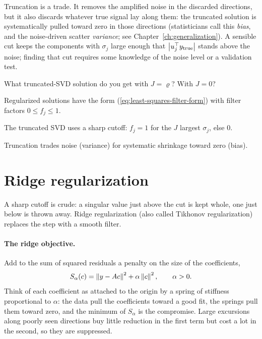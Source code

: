 Truncation is a trade. It removes the amplified noise in the discarded directions, but it also discards whatever true signal lay along them: the truncated solution is systematically pulled toward zero in those directions (statisticians call this \emph{bias}, and the noise-driven scatter \emph{variance}; see Chapter~\ref{ch:generalization}). A sensible cut keeps the components with $\sigma_j$ large enough that $\left\lvert u_j^\top y_{\rm true}\right\rvert$ stands above the noise; finding that cut requires some knowledge of the noise level or a validation test.

\begin{checkpoint}
What truncated-SVD solution do you get with $J = \varrho$? With $J = 0$?
\end{checkpoint}

\begin{keyideas}
\item Regularized solutions have the form (\cref{eq:least-squares-filter-form}) with filter factors $0\le f_j\le1$.
\item The truncated SVD uses a sharp cutoff: $f_j = 1$ for the $J$ largest $\sigma_j$, else $0$.
\item Truncation trades noise (variance) for systematic shrinkage toward zero (bias).
\end{keyideas}

\section{Ridge regularization}\label{sec:least-squares-ridge}

A sharp cutoff is crude: a singular value just above the cut is kept whole, one just below is thrown away. Ridge regularization (also called Tikhonov regularization) replaces the step with a smooth filter.

\paragraph{The ridge objective.} Add to the sum of squared residuals a penalty on the size of the coefficients,
\begin{equation}
S_\alpha(c) = \left\lVert y - Ac\right\rVert^2 + \alpha\left\lVert c\right\rVert^2,\qquad \alpha>0 .
\label{eq:least-squares-ridge-obj}
\end{equation}
Think of each coefficient as attached to the origin by a spring of stiffness proportional to $\alpha$: the data pull the coefficients toward a good fit, the springs pull them toward zero, and the minimum of $S_\alpha$ is the compromise. Large excursions along poorly seen directions buy little reduction in the first term but cost a lot in the second, so they are suppressed.

